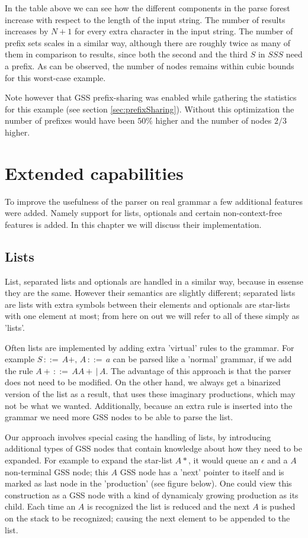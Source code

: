 \documentclass[a4paper,10pt]{article}
\begin{document}
In the table above we can see how the different components in the parse forest increase with respect to the length of the input string. The number of results increases by $N + 1$ for every extra character in the input string. The number of prefix sets scales in a similar way, although there are roughly twice as many of them in comparison to results, since both the second and the third $S$ in $SSS$ need a prefix. As can be observed, the number of nodes remains within cubic bounds for this worst-case example.

Note however that GSS prefix-sharing was enabled while gathering the statistics for this example (see section \ref{sec:prefixSharing}). Without this optimization the number of prefixes would have been $50\%$ higher and the number of nodes $2/3$ higher.

\section{Extended capabilities}

To improve the usefulness of the parser on real grammar a few additional features were added. Namely support for lists, optionals and certain non-context-free features is added. In this chapter we will discuss their implementation.

\subsection{Lists}

List, separated lists and optionals are handled in a similar way, because in essense they are the same. However their semantics are slightly different; separated lists are lists with extra symbols between their elements and optionals are star-lists with one element at most; from here on out we will refer to all of these simply as 'lists'.

Often lists are implemented by adding extra 'virtual' rules to the grammar. For example $S\,::=\,A+,\,A\,::=\,a$ can be parsed like a 'normal' grammar, if we add the rule $A+\,::=\,AA+\,|\,A$. The advantage of this approach is that the parser does not need to be modified. On the other hand, we always get a binarized version of the list as a result, that uses these imaginary productions, which may not be what we wanted. Additionally, because an extra rule is inserted into the grammar we need more GSS nodes to be able to parse the list.

Our approach involves special casing the handling of lists, by introducing additional types of GSS nodes that contain knowledge about how they need to be expanded. For example to expand the star-list $A*$, it would queue an $\epsilon$ and a $A$ non-terminal GSS node; this $A$ GSS node has a 'next' pointer to itself and is marked as last node in the 'production' (see figure below). One could view this construction as a GSS node with a kind of dynamicaly growing production as its child. Each time an $A$ is recognized the list is reduced and the next $A$ is pushed on the stack to be recognized; causing the next element to be appended to the list.
\end{document}
